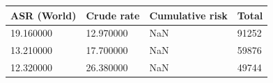 \begin{tabular}{p{2cm}p{2cm}p{2.5cm}p{1.5cm}}
\toprule
ASR (World) & Crude rate & Cumulative risk & Total \\
\midrule
19.160000 & 12.970000 & NaN & 91252 \\
13.210000 & 17.700000 & NaN & 59876 \\
12.320000 & 26.380000 & NaN & 49744 \\
\bottomrule
\end{tabular} 